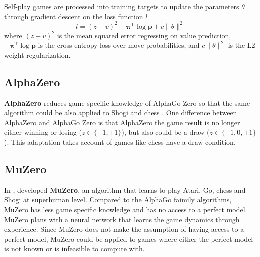 Self-play games are processed into training targets to update the parameters $\theta$ through gradient descent on the loss function $l$
\begin{equation*}
    l = (z-v)^{2} - \pmb{\pi}^{\mathrm{T}} \log \pmb{p}+c\|\theta\|^{2}
\end{equation*}
where $(z-v)^2$ is the mean squared error regressing on value prediction,
$-\pmb{\pi}^{\mathrm{T}} \log \pmb{p}$ is the cross-entropy loss over move probabilities,
and $c\|\theta\|^2$ is the L2 weight regularization.


\subsection{AlphaZero}
\textbf{AlphaZero} reduces game specific knowledge of AlphaGo Zero so that the same algorithm could be also applied to Shogi and chess
\cite{MasteringChessShogi_Silver.Hubert.ea_2017}.
One difference between AlphaZero and AlphaGo Zero is that AlphaZero the game result is no
longer either winning or losing ($z \in \{ -1, +1 \}$), but also could be a draw ($z \in \{-1, 0, +1 \}$).
This adaptation takes account of games like chess have a draw condition.

\subsection{MuZero} \label{sec:muzero}
In \citeyear{MasteringAtariGo_Schrittwieser.Antonoglou.ea_2020},
\citeauthor{MasteringAtariGo_Schrittwieser.Antonoglou.ea_2020} developed
\textbf{MuZero}, an algorithm that learns to play Atari, Go, chess and Shogi at superhuman level.
Compared to the AlphaGo faimily algorithms,
MuZero has less game specific knowledge and has no access to a perfect model.
MuZero plans with a neural network that learns the game dynamics through experience.
Since MuZero does not make the assumption of having access to a perfect model,
MuZero could be applied to games where either the perfect model is not known or is infeasible to compute with.

